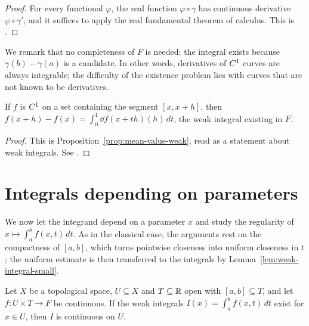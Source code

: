 \begin{proof}
  \leanok
  For every functional $\varphi$, the real function $\varphi \circ \gamma$ has continuous
  derivative $\varphi \circ \gamma'$, and it suffices to apply the real fundamental theorem of
  calculus. This is \cite[1.1.5]{GN26}.
\end{proof}

We remark that no completeness of $F$ is needed: the integral exists because
$\gamma(b) - \gamma(a)$ is a candidate. In other words, derivatives of $C^{1}$ curves are
always integrable; the difficulty of the existence problem lies with curves that are not known
to be derivatives.

\begin{corollary}
  \label{cor:ftc-segment}
  \leanok
  If $f$ is $C^{1}$ on a set containing the segment $[x, x + h]$, then
  $f(x + h) - f(x) = \int_0^1 \dd f(x + th)(h)\, dt$, the weak integral existing in $F$.
\end{corollary}

\begin{proof}
  \leanok
  This is Proposition~\ref{prop:mean-value-weak}, read as a statement about weak integrals.
  See \cite[1.2.6]{GN26}.
\end{proof}

\section{Integrals depending on parameters}

We now let the integrand depend on a parameter $x$ and study the regularity of
$x \mapsto \int_a^b f(x, t)\, dt$. As in the classical case, the arguments rest on the
compactness of $[a, b]$, which turns pointwise closeness into uniform closeness in $t$; the
uniform estimate is then transferred to the integrals by
Lemma~\ref{lem:weak-integral-small}.

\begin{proposition}[Continuity]
  \label{prop:param-continuity}
  \leanok
  Let $X$ be a topological space, $U \subseteq X$ and $T \subseteq \mathbb{R}$ open with
  $[a, b] \subseteq T$, and let $f \colon U \times T \to F$ be continuous. If the weak integrals
  $I(x) = \int_a^b f(x, t)\, dt$ exist for $x \in U$, then $I$ is continuous on $U$.
\end{proposition}

